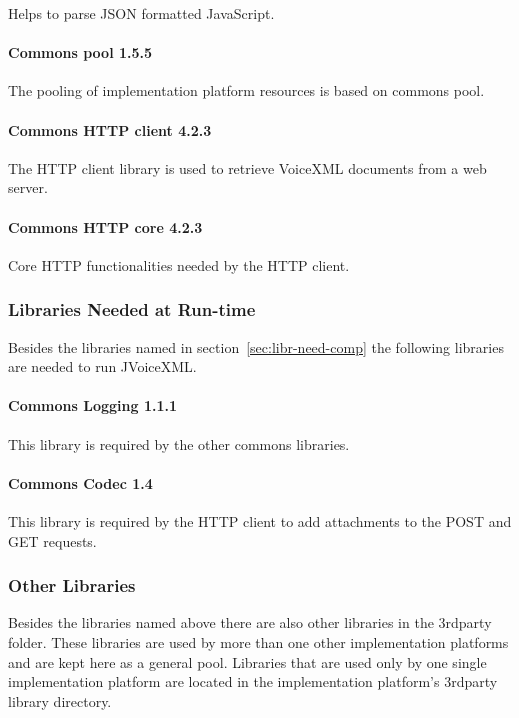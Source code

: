 \documentclass[11pt,a4paper]{article}
\begin{document}
Helps to parse JSON formatted JavaScript.

\paragraph{Commons pool 1.5.5}

The pooling of implementation platform resources is based on commons
pool.

\paragraph{Commons HTTP client 4.2.3}

The HTTP client library is used to retrieve VoiceXML documents from a web
server.

\paragraph{Commons HTTP core 4.2.3}

Core HTTP functionalities needed by the HTTP client.

\subsubsection{Libraries Needed at Run-time}

Besides the libraries named in section~\ref{sec:libr-need-comp} the following
libraries are needed to run JVoiceXML.

\paragraph{Commons Logging 1.1.1}
\label{sec:commons-logging}

This library is required by the other commons libraries.

\paragraph{Commons Codec 1.4}
\label{sec:commons-codec}

This library is required by the HTTP client to add attachments to the POST and
GET requests.


\subsubsection{Other Libraries}

Besides the libraries named above there are also other libraries in the
3rdparty folder. These libraries are used by more than one other implementation
platforms and are kept here as a general pool. Libraries that are used only by
one single implementation platform are located in the implementation platform's
3rdparty library directory.
\end{document}
